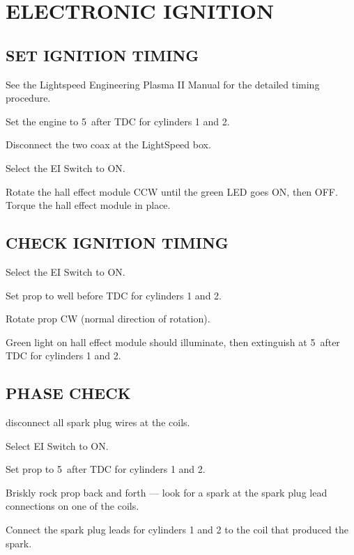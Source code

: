 \section{ELECTRONIC IGNITION}
\subsection{SET IGNITION TIMING} 
\begin{enumerate*}
	\item See the Lightspeed Engineering Plasma II Manual for the detailed timing procedure. 
	\item Set the engine to 5\textdegree ~after TDC for cylinders 1 and 2.
	\item Disconnect the two coax at the LightSpeed box.
	\item Select the EI Switch to ON.
	\item Rotate the hall effect module CCW until the green LED goes ON, then OFF.  Torque the hall effect module in place.
\end{enumerate*}
\subsection{CHECK IGNITION TIMING} 
\begin{enumerate*}
	\item Select the EI Switch to ON.
	\item Set prop to well before TDC for cylinders 1 and 2.
	\item Rotate prop CW (normal direction of rotation).
	\item Green light on hall effect module should illuminate, then extinguish at 5\textdegree ~after TDC for cylinders 1 and 2.
\end{enumerate*}

  \subsection{PHASE CHECK} 
  \begin{enumerate*}
  	\item disconnect all spark plug wires at the coils.  
  	\item Select EI Switch to ON.  
  	\item Set prop to 5\textdegree ~after TDC for cylinders 1 and 2.  
  	\item Briskly rock prop back and forth --- look for a spark at the spark plug lead connections on one of the coils.  
  	\item Connect the spark plug leads for cylinders 1 and 2 to the coil that produced the spark.
\end{enumerate*}

